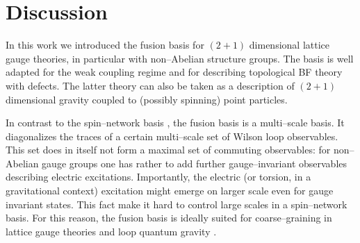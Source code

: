 \documentclass[nofootinbib,superscriptaddress,eqsecnum,tightenlines,11pt]{revtex4-1}
\begin{document}
\section{Discussion}\label{discussion}


In this work we introduced  the fusion basis for $(2+1)$ dimensional lattice gauge theories, in particular with non--Abelian structure groups. The basis is well adapted for the weak coupling regime and for describing topological BF theory with defects. The latter theory can also be taken as a description of $(2+1)$ dimensional gravity coupled to (possibly spinning) point particles. 

In contrast to the spin--network basis \cite{RovSmol}, the fusion basis is a multi--scale basis. It diagonalizes the traces of a certain multi--scale set of Wilson loop observables. This set does in itself not form a maximal set of commuting observables: for non--Abelian gauge groups one has rather to add further gauge--invariant observables describing  electric excitations.  Importantly, the electric (or torsion, in a gravitational context) excitation might emerge on larger scale even for gauge invariant states. This fact make it hard to control large scales in a spin--network basis.  For this reason, the fusion basis is ideally suited for coarse--graining  in lattice gauge theories and loop quantum gravity \cite{EteraCG,Clement,EteraTags,FiniteSF,Luca,BS,DittStein13,DecTNW}.
\end{document}
